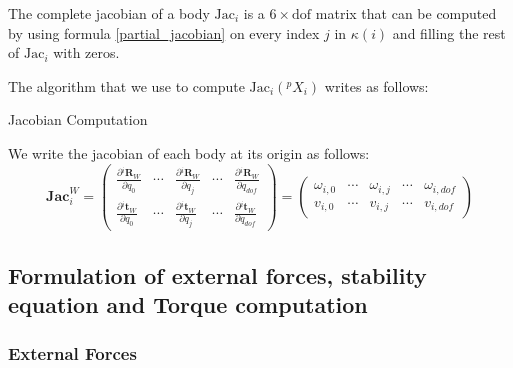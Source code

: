 The complete jacobian of a body $\text{Jac}_i$ is a $6\times \text{dof}$ matrix that can be computed by using formula \ref{partial_jacobian} on every index $j$ in $\kappa(i)$ and filling the rest of $\text{Jac}_i$ with zeros.

The algorithm that we use to compute $\text{Jac}_i({}^pX_i)$ writes as follows:

\begin{algorithm}
  \caption{Jacobian Computation}
  \label{Jacobian}
\begin{algorithmic}
  \EndFor
\end{algorithmic}
\end{algorithm}



We write the jacobian of each body at its origin as follows:
\begin{equation}
  \mathbf{Jac}^W_i = 
  \begin{pmatrix}
    \frac{\partial {}^i\mathbf{R}_W}{\partial q_0} & \cdots &
    \frac{\partial {}^i\mathbf{R}_W}{\partial q_j} & \cdots &
    \frac{\partial {}^i\mathbf{R}_W}{\partial q_{dof}} \\
    \frac{\partial {}^i\mathbf{t}_W}{\partial q_0} & \cdots &
    \frac{\partial {}^i\mathbf{t}_W}{\partial q_j} & \cdots &
    \frac{\partial {}^i\mathbf{t}_W}{\partial q_{dof}}
  \end{pmatrix}
= 
  \begin{pmatrix}
    \omega_{i,0} & \cdots &
    \omega_{i,j} & \cdots &
    \omega_{i,dof} \\
    v_{i,0} & \cdots &
    v_{i,j} & \cdots &
    v_{i,dof}
  \end{pmatrix}
\end{equation}


\subsection{Formulation of external forces, stability equation and Torque computation}
\label{sub:formulation_of_external_forces_stability_equation_and_torque_computation}

\subsubsection{External Forces}
\label{subsub:external_forces}

